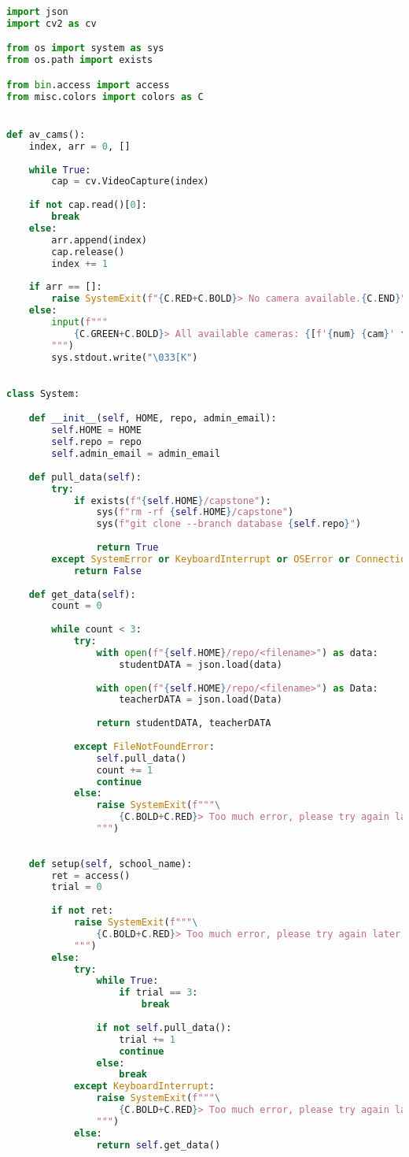 \documentclass[12pt]{article}
\begin{document}
\singlespacing
\begin{lstlisting}[language=Python, caption={\texttt{function.py}}]
import json
import cv2 as cv

from os import system as sys
from os.path import exists

from bin.access import access
from misc.colors import colors as C


def av_cams():
	index, arr = 0, []
	
	while True:
		cap = cv.VideoCapture(index)
	
	if not cap.read()[0]:
		break
	else:
		arr.append(index)
		cap.release()
		index += 1
	
	if arr == []:
		raise SystemExit(f"{C.RED+C.BOLD}> No camera available.{C.END}")
	else:
		input(f"""
			{C.GREEN+C.BOLD}> All available cameras: {[f'{num} {cam}' for num, cam in enumerate(arr)]}{C.END}\nPress any key to clear ...
		""")
		sys.stdout.write("\033[K")
	

class System:

	def __init__(self, HOME, repo, admin_email):
		self.HOME = HOME
		self.repo = repo
		self.admin_email = admin_email
	
	def pull_data(self):
		try:
			if exists(f"{self.HOME}/capstone"):
				sys(f"rm -rf {self.HOME}/capstone")
				sys(f"git clone --branch database {self.repo}")
		
				return True
		except SystemError or KeyboardInterrupt or OSError or ConnectionError:
			return False
		
	def get_data(self):
		count = 0
		
		while count < 3:
			try:
				with open(f"{self.HOME}/repo/<filename>") as data:
					studentDATA = json.load(data)
				
				with open(f"{self.HOME}/repo/<filename>") as Data:
					teacherDATA = json.load(Data)
				
				return studentDATA, teacherDATA
			
			except FileNotFoundError:
				self.pull_data()
				count += 1
				continue
			else:
				raise SystemExit(f"""\
					{C.BOLD+C.RED}> Too much error, please try again later.{C.END}
				""")
		
	
	def setup(self, school_name):
		ret = access()
		trial = 0
		
		if not ret:
			raise SystemExit(f"""\
				{C.BOLD+C.RED}> Too much error, please try again later.{C.END}
			""")
		else:
			try:
				while True:
					if trial == 3:
						break
					
				if not self.pull_data():                    
					trial += 1
					continue
				else:
					break
			except KeyboardInterrupt:
				raise SystemExit(f"""\
					{C.BOLD+C.RED}> Too much error, please try again later.{C.END}
				""")
			else:
				return self.get_data()
		
\end{lstlisting}
\doublespacing
\end{document}
